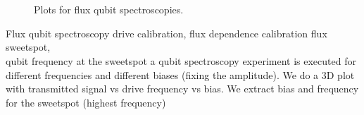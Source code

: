 \begin{figure}[H]
    \centering
    \\
    \\
    \caption{Plots for flux qubit spectroscopies.}
    \label{fig:qubit_spectroscopy_new}
\end{figure}

\fluxexperimentrecap
{Flux qubit spectroscopy}
{drive calibration, flux dependence calibration}
{flux sweetspot,\\qubit frequency at the sweetspot}
{a qubit spectroscopy experiment is executed for different frequencies and different biases (fixing the amplitude). We do a 3D plot with transmitted signal vs drive frequency vs bias. We extract bias and frequency for the sweetspot (highest frequency)}

